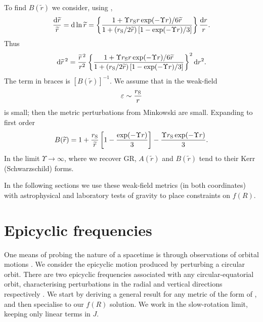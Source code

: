 To find $B(\widetilde{r})$ we consider, using ,
\begin{equation}
\frac{\mathrm{d} \widetilde{r}}{\widetilde{r}} =  \mathrm{d} \ln \widetilde{r} = \left\{\frac{1 + {\Upsilon r_\mathrm{S}r\exp(-\Upsilon r)}/{6\widetilde{r}}}{1 + ({r_\mathrm{S}}/{2\widetilde{r}})\left[1 - {\exp(-\Upsilon r)}/{3}\right]}\right\}\frac{\mathrm{d} r}{r}.
\end{equation}
Thus
\begin{equation}
\mathrm{d} \widetilde{r}^{\,2} = \frac{\widetilde{r}^{\,2}}{r^2}\left\{\frac{1 + {\Upsilon r_\mathrm{S}r\exp(-\Upsilon r)}/{6\widetilde{r}}}{1 + ({r_\mathrm{S}}/{2\widetilde{r}})\left[1 - {\exp(-\Upsilon r)}/{3}\right]}\right\}^2 \mathrm{d} r^2.
\end{equation}
The term in braces is $\left[B(\widetilde{r})\right]^{-1}$. We assume that in the weak-field
\begin{equation}
\varepsilon \sim \frac{r_\mathrm{S}}{r}
\end{equation}
is small; then the metric perturbations from Minkowski are small. Expanding to first order \citep{Olmo2007c}
\begin{equation}
B(\widetilde{r})  = 1 + \frac{r_\mathrm{S}}{\widetilde{r}}\left[1 - \frac{\exp(-\Upsilon r )}{3}\right] - \frac{\Upsilon r_\mathrm{S} \exp(-\Upsilon r)}{3}.
\label{eq:B_metric}
\end{equation}
In the limit $\Upsilon \rightarrow \infty$, where we recover GR, $A(\widetilde{r})$ and $B(\widetilde{r})$ tend to their Kerr (Schwarzschild) forms.

In the following sections we use these weak-field metrics (in both coordinates) with astrophysical and laboratory tests of gravity to place constraints on $f(R)$.

\section{Epicyclic frequencies}\label{sec:Epicycle}

One means of probing the nature of a spacetime is through observations of orbital motions \citep{Gair2008}. We consider the epicyclic motion produced by perturbing a circular orbit. There are two epicyclic frequencies associated with any circular-equatorial orbit, characterising perturbations in the radial and vertical directions respectively \citep[section 3.2.3]{Binney2008}. We start by deriving a general result for any metric of the form of , and then specialise to our $f(R)$ solution. We work in the slow-rotation limit, keeping only linear terms in $J$.

